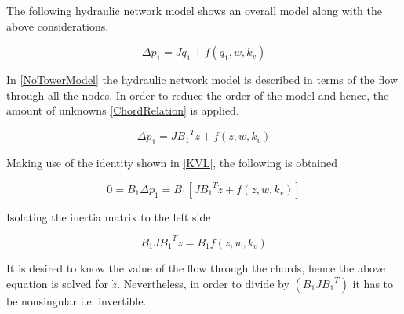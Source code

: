 
The following hydraulic network model shows an overall model along with the above considerations. 

\begin{equation}
  \Delta p_1 = J \dot{q}_1 + f(q_1, w, k_v)
  \label{NoTowerModel}
\end{equation}

In \eqref{NoTowerModel} the hydraulic network model is described in terms of the 
flow through all the nodes. In order to reduce the order of the model and hence, 
the amount of unknowns \eqref{ChordRelation} is applied. 

\begin{equation}
  \Delta p_1 = J {B_1}^T \dot{z} + f(z, w, k_v)
  \label{ChordsModel}
\end{equation}

Making use of the identity shown in \eqref{KVL}, the following is obtained

\begin{equation}
  0 = B_1 \Delta p_1 = B_1 [J {B_1}^T \dot{z} + f(z, w, k_v)] 
 \end{equation}

Isolating the inertia matrix to the left side

\begin{equation}
  B_1 J {B_1}^T \dot{z}  = B_1 f(z, w, k_v)
 \end{equation}

It is desired to know the value of the flow through the chords, hence the above equation is solved 
for $\dot{z}$. Nevertheless, in order to divide by $(B_1 J {B_1}^T)$ it has to be nonsingular i.e. invertible. 

%
%

